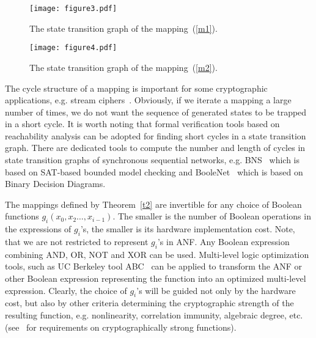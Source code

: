 \documentclass[9pt,conference]{IEEEtran} \usepackage{times}
\begin{document}
\begin{figure}[t!]
\begin{center}
\texttt{[image: figure3.pdf]}
\caption{The state transition graph of the mapping~(\ref{m1}).}\label{fm1}
\end{center}
\end{figure}


\begin{figure}[t!]
\begin{center}
\texttt{[image: figure4.pdf]}
\caption{The state transition graph of the mapping~(\ref{m2}).}\label{fm2}
\end{center}
\end{figure}

The cycle structure of a mapping is important for some cryptographic applications, e.g. stream ciphers~\cite{robshaw94stream}. Obviously, if we iterate a mapping a large number of times, we do not want the sequence of generated states to be trapped in a short cycle. 
It is worth noting 
that formal verification tools based on reachability analysis can be adopted for finding short cycles in a state transition graph. There are dedicated tools to compute the number and length of cycles in state transition graphs of synchronous sequential networks, e.g. BNS~\cite{DuT11} which is based on SAT-based bounded model checking and BooleNet~\cite{DuTM05} which is based on Binary Decision Diagrams. 

The mappings defined by Theorem~\ref{t2} are invertible for any choice of Boolean functions $g_i(x_0,x_2\ldots,x_{i-1})$. 
The smaller is the number of Boolean operations in the expressions of $g_i$'s,
the smaller is its hardware implementation cost.
Note, that we are not restricted to represent $g_i$'s in ANF. Any Boolean expression combining AND, OR, NOT and XOR can be used. 
Multi-level logic optimization tools, such as UC Berkeley tool ABC~\cite{abc} 
can be applied to transform the ANF or other Boolean expression representing the function into 
an optimized multi-level expression.
Clearly, the choice of $g_i$'s will be guided not only by the hardware cost,
but also by other criteria determining the cryptographic strength of the resulting function, e.g. nonlinearity, correlation immunity, algebraic degree, etc. (see~\cite{CuS09} for requirements on cryptographically strong functions).
\end{document}
